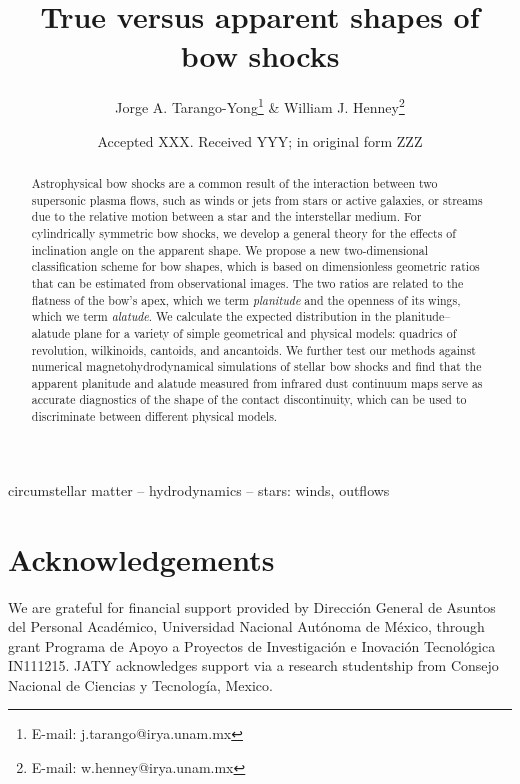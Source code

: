 \documentclass[useAMS, usenatbib, a4paper]{mnras}
\title[Bow shock shapes]{True versus apparent shapes of bow shocks}
\author[Tarango-Yong \& Henney]{
  Jorge A. Tarango-Yong\thanks{E-mail: j.tarango@irya.unam.mx}
  \& William J. Henney\thanks{E-mail: w.henney@irya.unam.mx}\\
  \AddressCRyA
}
\date{Accepted XXX. Received YYY; in original form ZZZ}
\begin{document}
\label{firstpage}
\pagerange{\pageref{firstpage}--\pageref{lastpage}}
\maketitle
\begin{abstract}
  Astrophysical bow shocks are a common result of the interaction
  between two supersonic plasma flows, such as winds or jets from
  stars or active galaxies, or streams due to the relative motion
  between a star and the interstellar medium.
  For cylindrically symmetric bow shocks, we develop a general theory
  for the effects of inclination angle on the apparent shape. We
  propose a new two-dimensional classification scheme for bow shapes,
  which is based on dimensionless geometric ratios that can be
  estimated from observational images.  The two ratios are related to
  the flatness of the bow's apex, which we term \textit{planitude} and
  the openness of its wings, which we term \textit{alatude}.  We
  calculate the expected distribution in the planitude--alatude plane
  for a variety of simple geometrical and physical models: quadrics of
  revolution, wilkinoids, cantoids, and ancantoids.  We further test
  our methods against numerical magnetohydrodynamical simulations of
  stellar bow shocks and find that the apparent planitude and alatude
  measured from infrared dust continuum maps serve as accurate
  diagnostics of the shape of the contact discontinuity, which can be
  used to discriminate between different physical models.
\end{abstract}

\begin{keywords}
  circumstellar matter -- hydrodynamics -- stars: winds, outflows
\end{keywords}


% 



% 
% 


\section*{Acknowledgements}

We are grateful for financial support provided by Dirección General de
Asuntos del Personal Académico, Universidad Nacional Autónoma de
México, through grant Programa de Apoyo a Proyectos de Investigación e
Inovación Tecnológica IN111215.  JATY acknowledges support via a
research studentship from Consejo Nacional de Ciencias y Tecnología,
Mexico.



\appendix


%

% 

\bsp	%
\label{lastpage}
\end{document}
